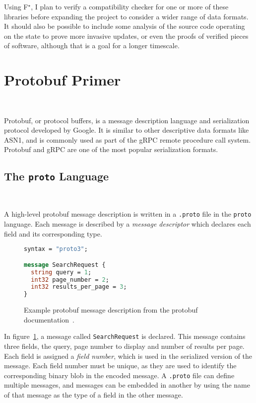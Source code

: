 \documentclass[11pt]{article}
\theoremstyle{definition}
\theoremstyle{plain}
\newcommand{\fstar}{F$^\star$}
\begin{document}
Using \fstar{}, I plan to verify a compatibility checker for one or more of
these libraries before expanding the project to consider a wider range of data
formats. It should also be possible to include some analysis of the source code
operating on the state to prove more invasive updates, or even the proofs of
verified pieces of software, although that is a goal for a longer timescale.

\section{Protobuf Primer}~\label{sec:proto}

Protobuf, or protocol buffers, is a message description language and
serialization protocol developed by Google. It is similar to other descriptive
data formats like ASN1, and is commonly used as part of the gRPC remote
procedure call system. Protobuf and gRPC are one of the most popular
serialization formats.

\subsection{The \texttt{proto} Language}~\label{sec:proto-lang}

A high-level protobuf message description is written in a \texttt{.proto} file
in the \texttt{proto} language. Each message is described by a \emph{message
	descriptor} which declares each field and its corresponding type.

\begin{figure}[H]
	\begin{lstlisting}[language=proto]
syntax = "proto3";

message SearchRequest {
  string query = 1;
  int32 page_number = 2;
  int32 results_per_page = 3;
}\end{lstlisting}

	\caption{Example protobuf message description from the protobuf documentation~\cite{LanguageGuideProto}.}
	\label{fig:proto-ex}
\end{figure}

In figure~\ref{fig:proto-ex}, a message called \texttt{SearchRequest} is
declared. This message contains three fields, the query, page number to display
and number of results per page. Each field is assigned a \emph{field number},
which is used in the serialized version of the message. Each field number must
be unique, as they are used to identify the corresponding binary blob in the
encoded message. A \texttt{.proto} file can define multiple messages, and
messages can be embedded in another by using the name of that message as the
type of a field in the other message.
\end{document}
